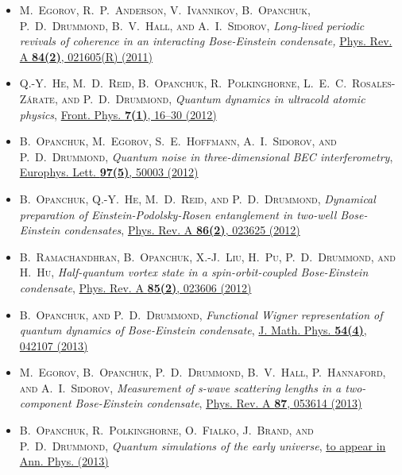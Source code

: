 
\begin{itemize}
\item[\hfleuron] \textsc{M.~Egorov, R.~P.~Anderson, V.~Ivannikov, B.~Opanchuk, P.~D.~Drummond, B.~V.~Hall, \textnormal{and} A.~I.~Sidorov}, \textit{Long-lived periodic revivals of coherence in an interacting Bose-Einstein condensate,} \href{http://dx.doi.org/doi:10.1103/PhysRevA.84.021605}{Phys. Rev. A \textbf{84(2)}, 021605(R) (2011)}

\item[\hfleuron] \textsc{Q.-Y.~He, M.~D.~Reid, B.~Opanchuk, R.~Polkinghorne, L.~E.~C.~Rosales-Z\'arate, \textnormal{and} P.~D.~Drummond}, \textit{Quantum dynamics in ultracold atomic physics}, \href{http://dx.doi.org/doi:10.1007/s11467-011-0232-x}{Front. Phys. \textbf{7(1)}, 16--30 (2012)}

\item[\hfleuron] \textsc{B.~Opanchuk, M.~Egorov, S.~E.~Hoffmann, A.~I.~Sidorov, \textnormal{and} P.~D.~Drummond}, \textit{Quantum noise in three-dimensional BEC interferometry}, \href{http://dx.doi.org/doi:10.1209/0295-5075/97/50003}{Europhys. Lett. \textbf{97(5)}, 50003 (2012)}

\item[\hfleuron] \textsc{B.~Opanchuk, Q.-Y.~He, M.~D.~Reid, \textnormal{and} P.~D.~Drummond}, \textit{Dynamical preparation of Einstein-Podolsky-Rosen entanglement in two-well Bose-Einstein condensates}, \href{http://dx.doi.org/doi:10.1103/PhysRevA.86.023625}{Phys. Rev. A \textbf{86(2)}, 023625 (2012)}

\item[\hfleuron] \textsc{B.~Ramachandhran, B.~Opanchuk, X.-J.~Liu, H.~Pu, P.~D.~Drummond, \textnormal{and} H.~Hu}, \textit{Half-quantum vortex state in a spin-orbit-coupled Bose-Einstein condensate}, \href{http://dx.doi.org/doi:10.1103/PhysRevA.85.023606}{Phys. Rev. A \textbf{85(2)}, 023606 (2012)}

\item[\hfleuron] \textsc{B.~Opanchuk, \textnormal{and} P.~D.~Drummond}, \textit{Functional Wigner representation of quantum dynamics of Bose-Einstein condensate}, \href{http://dx.doi.org/doi:10.1063/1.4801781}{J. Math. Phys. \textbf{54(4)}, 042107 (2013)}

\item[\hfleuron] \textsc{M.~Egorov, B.~Opanchuk, P.~D.~Drummond, B.~V.~Hall, P.~Hannaford, \textnormal{and} A.~I.~Sidorov}, \textit{Measurement of s-wave scattering lengths in a two-component Bose-Einstein condensate}, \href{http://dx.doi.org/doi:10.1103/PhysRevA.87.053614}{Phys. Rev. A \textbf{87}, 053614 (2013)}

\item[\hfleuron] \textsc{B.~Opanchuk, R.~Polkinghorne, O.~Fialko, J.~Brand, \textnormal{and} P.~D.~Drummond}, \textit{Quantum simulations of the early universe}, \href{http://dx.doi.org/doi:10.1002/andp.201300113}{to appear in Ann. Phys. (2013)}
\end{itemize}

